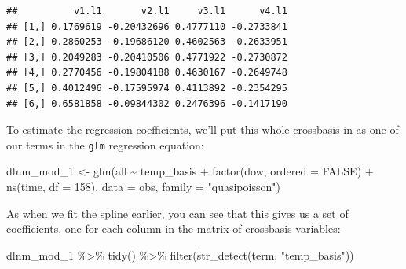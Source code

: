 \documentclass[
]{book}
\newenvironment{Shaded}{\begin{snugshade}}{\end{snugshade}}
\newcommand{\AttributeTok}[1]{\textcolor[rgb]{0.77,0.63,0.00}{#1}}
\newcommand{\ConstantTok}[1]{\textcolor[rgb]{0.00,0.00,0.00}{#1}}
\newcommand{\DecValTok}[1]{\textcolor[rgb]{0.00,0.00,0.81}{#1}}
\newcommand{\FunctionTok}[1]{\textcolor[rgb]{0.00,0.00,0.00}{#1}}
\newcommand{\NormalTok}[1]{#1}
\newcommand{\OtherTok}[1]{\textcolor[rgb]{0.56,0.35,0.01}{#1}}
\newcommand{\SpecialCharTok}[1]{\textcolor[rgb]{0.00,0.00,0.00}{#1}}
\newcommand{\StringTok}[1]{\textcolor[rgb]{0.31,0.60,0.02}{#1}}
\begin{document}
\begin{Shaded}
\end{Shaded}

\begin{verbatim}
##          v1.l1       v2.l1     v3.l1      v4.l1
## [1,] 0.1769619 -0.20432696 0.4777110 -0.2733841
## [2,] 0.2860253 -0.19686120 0.4602563 -0.2633951
## [3,] 0.2049283 -0.20410506 0.4771922 -0.2730872
## [4,] 0.2770456 -0.19804188 0.4630167 -0.2649748
## [5,] 0.4012496 -0.17595974 0.4113892 -0.2354295
## [6,] 0.6581858 -0.09844302 0.2476396 -0.1417190
\end{verbatim}

To estimate the regression coefficients, we'll put this whole crossbasis in as one of
our terms in the \texttt{glm} regression equation:

\begin{Shaded}
\begin{Highlighting}[]
\NormalTok{dlnm\_mod\_1 }\OtherTok{\textless{}{-}} \FunctionTok{glm}\NormalTok{(all }\SpecialCharTok{\textasciitilde{}}\NormalTok{ temp\_basis }\SpecialCharTok{+} \FunctionTok{factor}\NormalTok{(dow, }\AttributeTok{ordered =} \ConstantTok{FALSE}\NormalTok{) }\SpecialCharTok{+}
                          \FunctionTok{ns}\NormalTok{(time, }\AttributeTok{df =} \DecValTok{158}\NormalTok{), }
                        \AttributeTok{data =}\NormalTok{ obs, }\AttributeTok{family =} \StringTok{"quasipoisson"}\NormalTok{)}
\end{Highlighting}
\end{Shaded}

As when we fit the spline earlier, you can see that this gives us a set of coefficients,
one for each column in the matrix of crossbasis variables:

\begin{Shaded}
\begin{Highlighting}[]
\NormalTok{dlnm\_mod\_1 }\SpecialCharTok{\%\textgreater{}\%} 
  \FunctionTok{tidy}\NormalTok{() }\SpecialCharTok{\%\textgreater{}\%} 
  \FunctionTok{filter}\NormalTok{(}\FunctionTok{str\_detect}\NormalTok{(term, }\StringTok{"temp\_basis"}\NormalTok{))}
\end{Highlighting}
\end{Shaded}
\end{document}
